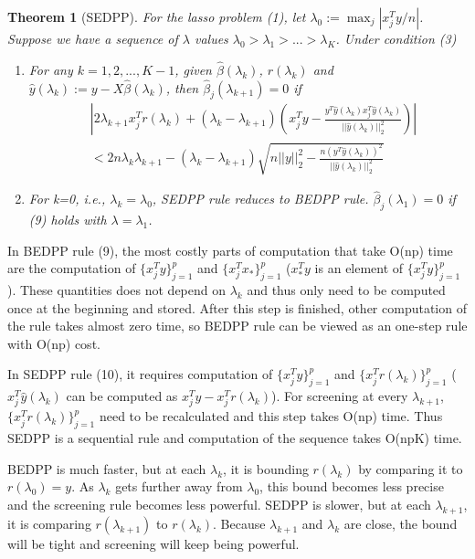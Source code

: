 \documentclass{article}
\newtheorem{theorem}{Theorem}[section]
\begin{document}
\begin{theorem}[SEDPP]
    For the lasso problem (1), let $\lambda_0:=\max_j|x_j^Ty/n|$. Suppose we have a sequence of $\lambda$ values $\lambda_0>\lambda_1>...>\lambda_K$. Under condition (3)
    \begin{enumerate}
        \item For any $k=1,2,...,K-1$, given $\hat{\beta}(\lambda_k)$, $r(\lambda_k)$ and $\hat{y}(\lambda_k):=y-X\hat{\beta}(\lambda_k)$, then $\hat{\beta}_j(\lambda_{k+1})=0$ if
        \begin{equation}
            \begin{split}
                &\left|2\lambda_{k+1}x_j^Tr(\lambda_k)+(\lambda_k-\lambda_{k+1})\left( x_j^Ty-\frac{y^T\hat{y}(\lambda_k)x_j^T\hat{y}(\lambda_k)}{||\hat{y}(\lambda_k)||_2^2}\right)\right|\\&<2n\lambda_k\lambda_{k+1}-(\lambda_k-\lambda_{k+1})\sqrt{n||y||_2^2-\frac{n(y^T\hat{y}(\lambda_k))^2}{||\hat{y}(\lambda_k)||_2^2}}
            \end{split}
        \end{equation}
        \item For k=0, i.e., $\lambda_k=\lambda_0$, SEDPP rule reduces to BEDPP rule. $\hat{\beta}_j(\lambda_1)=0$ if (9) holds with $\lambda=\lambda_1$.
    \end{enumerate}
\end{theorem}

In BEDPP rule (9), the most costly parts of computation that take O(np) time are the computation of $\{x_j^Ty\}_{j=1}^p$ and $\{x_j^Tx_*\}_{j=1}^p$ ($x_*^Ty$ is an element of $\{x_j^Ty\}_{j=1}^p$). These quantities does not depend on $\lambda_k$ and thus only need to be computed once at the beginning and stored. After this step is finished, other computation of the rule takes almost zero time, so BEDPP rule can be viewed as an one-step rule with O(np) cost.

In SEDPP rule (10), it requires computation of $\{x_j^Ty\}_{j=1}^p$ and $\{x_j^Tr(\lambda_k)\}_{j=1}^p$ ($x_j^T\hat{y}(\lambda_k)$ can be computed as $x_j^Ty-x_j^Tr(\lambda_k)$). For screening at every $\lambda_{k+1}$, $\{x_j^Tr(\lambda_k)\}_{j=1}^p$ need to be recalculated and this step takes O(np) time. Thus SEDPP is a sequential rule and computation of the sequence takes O(npK) time.

BEDPP is much faster, but at each $\lambda_k$, it is bounding $r(\lambda_k)$ by comparing it to $r(\lambda_0)=y$. As $\lambda_k$ gets further away from $\lambda_0$, this bound becomes less precise and the screening rule becomes less powerful. SEDPP is slower, but at each $\lambda_{k+1}$, it is comparing $r(\lambda_{k+1})$ to $r(\lambda_k)$. Because $\lambda_{k+1}$ and $\lambda_k$ are close, the bound will be tight and screening will keep being powerful.
\end{document}
